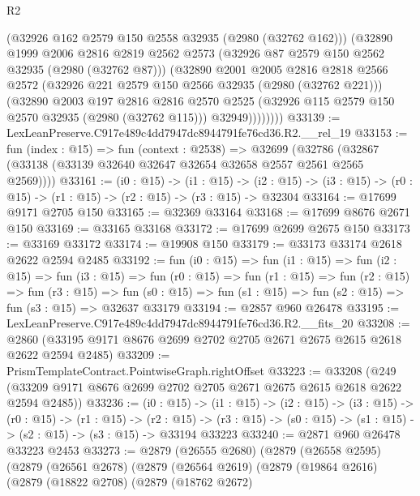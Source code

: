 \begin{lexlean}{R2}
\begin{coremodule}
              (@32926 @162 @2579 @150 @2558 @32935 (@2980 (@32762 @162)))
              (@32890
                @1999
                @2006
                @2816
                @2819
                @2562
                @2573
                (@32926 @87 @2579 @150 @2562 @32935 (@2980 (@32762 @87)))
                (@32890
                  @2001
                  @2005
                  @2816
                  @2818
                  @2566
                  @2572
                  (@32926 @221 @2579 @150 @2566 @32935 (@2980 (@32762 @221)))
                  (@32890
                    @2003
                    @197
                    @2816
                    @2816
                    @2570
                    @2525
                    (@32926 @115 @2579 @150 @2570 @32935 (@2980 (@32762 @115)))
                    @32949))))))))
@33139 := LexLeanPreserve.C917e489c4dd7947dc8944791fe76cd36.R2.__rel_19
@33153 := fun (index : @15) =>
  fun (context : @2538) =>
  @32699 (@32786 (@32867 (@33138 (@33139 @32640 @32647 @32654 @32658 @2557 @2561 @2565 @2569))))
@33161 := (i0 : @15) ->
  (i1 : @15) ->
  (i2 : @15) -> (i3 : @15) -> (r0 : @15) -> (r1 : @15) -> (r2 : @15) -> (r3 : @15) -> @32304
@33164 := @17699 @9171 @2705 @150
@33165 := @32369 @33164
@33168 := @17699 @8676 @2671 @150
@33169 := @33165 @33168
@33172 := @17699 @2699 @2675 @150
@33173 := @33169 @33172
@33174 := @19908 @150
@33179 := @33173 @33174 @2618 @2622 @2594 @2485
@33192 := fun (i0 : @15) =>
  fun (i1 : @15) =>
  fun (i2 : @15) =>
  fun (i3 : @15) =>
  fun (r0 : @15) =>
  fun (r1 : @15) =>
  fun (r2 : @15) =>
  fun (r3 : @15) =>
  fun (s0 : @15) => fun (s1 : @15) => fun (s2 : @15) => fun (s3 : @15) => @32637 @33179
@33194 := @2857 @960 @26478
@33195 := LexLeanPreserve.C917e489c4dd7947dc8944791fe76cd36.R2.__fits_20
@33208 := @2860 (@33195 @9171 @8676 @2699 @2702 @2705 @2671 @2675 @2615 @2618 @2622 @2594 @2485)
@33209 := PrismTemplateContract.PointwiseGraph.rightOffset
@33223 := @33208
    (@249 (@33209 @9171 @8676 @2699 @2702 @2705 @2671 @2675 @2615 @2618 @2622 @2594 @2485))
@33236 := (i0 : @15) ->
  (i1 : @15) ->
  (i2 : @15) ->
  (i3 : @15) ->
  (r0 : @15) ->
  (r1 : @15) ->
  (r2 : @15) -> (r3 : @15) -> (s0 : @15) -> (s1 : @15) -> (s2 : @15) -> (s3 : @15) -> @33194 @33223
@33240 := @2871 @960 @26478 @33223 @2453
@33273 := @2879
    (@26555 @2680)
    (@2879
      (@26558 @2595)
      (@2879
        (@26561 @2678)
        (@2879
          (@26564 @2619)
          (@2879
            (@19864 @2616)
            (@2879
              (@18822 @2708)
              (@2879
                (@18762 @2672)

\end{coremodule}
\end{lexlean}
